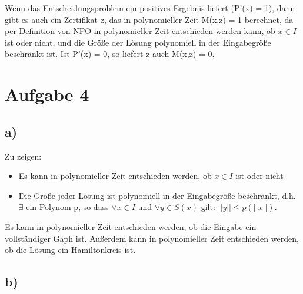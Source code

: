 \documentclass[a4paper,10pt,oneside,leqno]{scrartcl}
\begin{document}
Wenn das Entscheidungsproblem ein positives Ergebnis liefert (P'(x) = 1), dann gibt es auch ein Zertifikat z, das in polynomieller Zeit M(x,z) = 1
berechnet, da per Definition von NPO in polynomieller Zeit entschieden werden kann, ob $x \in I$ ist oder nicht, und die Größe der Lösung
polynomiell in der Eingabegröße beschränkt ist. Ist P'(x) = 0, so liefert z auch M(x,z) = 0.
\section*{Aufgabe 4}%
\subsection*{a)}
Zu zeigen: \begin{itemize}
            \item  Es kann in polynomieller Zeit entschieden werden, ob $x \in I$ ist oder nicht%
	    \item Die Größe jeder Lösung ist polynomiell in der Eingabegröße beschränkt, d.h. $\exists$ ein Polynom p, so dass $\forall x \in I$
	    und $\forall y \in S(x)$ gilt: $||y|| \leq p(||x||)$.
           \end{itemize}
Es kann in polynomieller Zeit entschieden werden, ob die Eingabe ein vollständiger Gaph ist. Außerdem kann in polynomieller Zeit entschieden werden,
ob die Lösung ein Hamiltonkreis ist.

\subsection*{b)}
\end{document}
